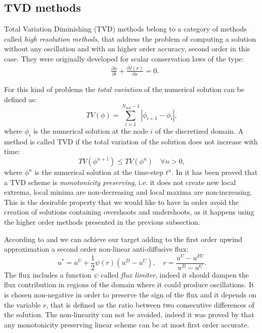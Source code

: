 \subsection{TVD methods} \label{subsec:tvd}
Total Variation Diminishing (TVD) methods belong to a category of methods 
called \emph{high resolution methods}, that address the problem of computing a 
solution without any oscillation and with an higher order accuracy, second 
order in this case. They were originally developed for scalar conservation laws 
of the type:
\begin{align}
	\label{eq:conslaw} &\frac{\partial \phi}{\partial t} + \frac{\partial f(x) 
	}{\partial x} = 0. 
\end{align}

For this kind of problems the \emph{total variation} of the numerical solution 
can be defined as:
\begin{equation}
	TV(\phi) = \sum_{i=1}^{N_\text{dof}-1} |\phi_{i+1} - \phi_i|,
\end{equation}
where $\phi_i$ is the numerical solution at the node $i$ of the discretized 
domain. A method is called TVD if the total variation of the 
solution does not increase with time: 
\begin{equation}\label{eq:tvdcondition}
	TV(\phi ^{n+1}) \leq TV(\phi^n) \quad \forall n>0,
\end{equation}
where $\phi^n$ is the numerical solution at the time-step $t^n$. In 
\cite{tvd:monotonicity} it has been proved that a TVD scheme is 
\emph{monotonicity preserving}, i.e. it does not create new 
local extrema, local minima are non-decreasing and local maxima are 
non-increasing. This is the desirable property that we would like to have in 
order avoid the creation of solutions containing overshoots and undershoots, 
as it happens using the higher order methods presented in the previous 
subsection.

According to \cite{tvd:sweeby} and \cite{main:darwish} we can achieve our 
target adding to the first order upwind approximation a second order 
non-linear 
anti-diffusive flux: 
\begin{equation} \label{eq:tvdformula}
u^* = u^U + \frac{1}{2}\psi(r)(u^D - u^U), \quad r = 
\frac{u^U - u^{FU}}{u^D - u^U}.
\end{equation}
The flux includes a function $\psi$ called \emph{flux limiter}, indeed it 
should dampen the flux contribution in regions of the domain where it 
could produce oscillations. It is chosen non-negative in order to preserve the 
sign of the flux and it depends on the variable $r$, that is defined as the 
ratio between two consecutive differences of the solution. The non-linearity 
can not be avoided, indeed it was proved by \textcite{tvd:godunov} that any 
monotonicity preserving linear scheme can be at most first order accurate.

